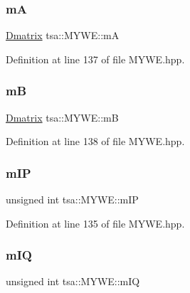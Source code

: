 \subsubsection{\texorpdfstring{mA}{mA}}
{\footnotesize\ttfamily \hyperlink{namespacetsa_ad260cd21c1891c4ed391fe788569aba4}{Dmatrix} tsa\+::\+M\+Y\+W\+E\+::mA\hspace{0.3cm}{\ttfamily [private]}}



Definition at line 137 of file M\+Y\+W\+E.\+hpp.

\mbox{\label{classtsa_1_1_m_y_w_e_a8427296f338e43ee0457e8f2c11481ae}} 
\subsubsection{\texorpdfstring{mB}{mB}}
{\footnotesize\ttfamily \hyperlink{namespacetsa_ad260cd21c1891c4ed391fe788569aba4}{Dmatrix} tsa\+::\+M\+Y\+W\+E\+::mB\hspace{0.3cm}{\ttfamily [private]}}



Definition at line 138 of file M\+Y\+W\+E.\+hpp.

\mbox{\label{classtsa_1_1_m_y_w_e_aefdc7e987eddb2a34daad521dd501840}} 
\subsubsection{\texorpdfstring{m\+IP}{mIP}}
{\footnotesize\ttfamily unsigned int tsa\+::\+M\+Y\+W\+E\+::m\+IP\hspace{0.3cm}{\ttfamily [private]}}



Definition at line 135 of file M\+Y\+W\+E.\+hpp.

\mbox{\label{classtsa_1_1_m_y_w_e_a7ad6499007931fab78ffa0300b0c21a5}} 
\subsubsection{\texorpdfstring{m\+IQ}{mIQ}}
{\footnotesize\ttfamily unsigned int tsa\+::\+M\+Y\+W\+E\+::m\+IQ\hspace{0.3cm}{\ttfamily [private]}}



